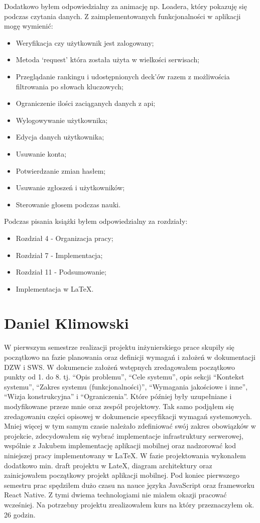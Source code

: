 Dodatkowo byłem odpowiedzialny za animację np. Loadera, który pokazuję się podczas czytania danych.
Z zaimplementowanych funkcjonalności w aplikacji mogę wymienić:

\begin{itemize}
    \item Weryfikacja czy użytkownik jest zalogowany;
    \item Metoda ‘request’ która została użyta w wielkości serwisach;
    \item Przeglądanie rankingu i udostępnionych deck’ów razem z możliwościa filtrowania po słowach kluczowych;
    \item Ograniczenie ilości zaciąganych danych z api;
    \item Wylogowywanie użytkownika;
    \item Edycja danych użytkownika;
    \item Usuwanie konta;
    \item Potwierdzanie zmian hasłem;
    \item Usuwanie zgłoszeń i użytkowników;
    \item Sterowanie głosem podczas nauki.
\end{itemize}

Podczas pisania książki byłem odpowiedzialny za rozdziały:

\begin{itemize}
    \item Rozdział 4 - Organizacja pracy;
    \item Rozdział 7 - Implementacja;
    \item Rozdział 11 - Podsumowanie;
    \item Implementacja w LaTeX.
\end{itemize}

\section{Daniel Klimowski}

W pierwszym semestrze realizacji projektu inżynierskiego prace skupiły się początkowo na fazie planowania oraz
definicji wymagań i założeń w dokumentacji DZW i SWS. W dokumencie założeń wstępnych zredagowałem początkowo punkty
od 1. do 8. tj. “Opis problemu”, “Cele systemu”, opis sekcji “Kontekst systemu”, “Zakres systemu (funkcjonalności)”,
“Wymagania jakościowe i inne”, “Wizja konstrukcyjna” i “Ograniczenia”. Które później były uzupełniane i modyfikowane
przeze mnie oraz zespół projektowy. Tak samo podjąłem się zredagowaniu części opisowej w dokumencie specyfikacji
wymagań systemowych. Mniej więcej w tym samym czasie należało zdefiniować swój zakres obowiązków w projekcie,
zdecydowałem się wybrać implementacje infrastruktury serwerowej, wspólnie z Jakubem implementację aplikacji mobilnej
oraz nadzorować kod niniejszej pracy implementowany w LaTeX. W fazie projektowania wykonałem dodatkowo min. draft
projektu w LateX, diagram architektury oraz zainicjowałem początkowy projekt aplikacji mobilnej. Pod koniec pierwszego
semestru prac spędziłem dużo czasu na nauce języka JavaScript oraz frameworku React Native. Z tymi dwiema technologiami
nie miałem okazji pracować wcześniej. Na potrzebny projektu zrealizowałem kurs na który przeznaczyłem ok. 26 godzin.

